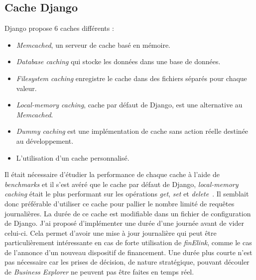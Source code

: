 \subsection{Cache Django}
Django propose 6 caches différents :
\begin{itemize}
\item \textit{Memcached}, un serveur de cache basé en mémoire.
\item \textit{Database caching} qui stocke les données dans une base de données.
\item \textit{Filesystem caching} enregistre le cache dans des fichiers séparés pour chaque valeur.
\item \textit{Local-memory caching}, cache par défaut de Django, est une alternative au \textit{Memcached}.
\item \textit{Dummy caching} est une implémentation de cache sans action réelle destinée au développement.
\item L'utilisation d'un cache personnalisé.
\end{itemize}
Il était nécessaire d'étudier la performance de chaque cache à l'aide de \textit{benchmarks} et il s'est avéré que le cache par défaut de Django, \textit{local-memory caching} était le plus performant sur les opérations \textit{get}, \textit{set} et \textit{delete}~\cite{CacheBench}. Il semblait donc préférable d'utiliser ce cache pour pallier le nombre limité de requêtes journalières. La durée de ce cache est modifiable dans un fichier de configuration de Django. J'ai proposé d'implémenter une durée d'une journée avant de vider celui-ci. Cela permet d'avoir une mise à jour journalière qui peut être particulièrement intéressante en cas de forte utilisation de \textit{finElink}, comme le cas de l'annonce d'un nouveau dispositif de financement. Une durée plus courte n'est pas nécessaire car les prises de décision, de nature stratégique, pouvant découler de \textit{Business Explorer} ne peuvent pas être faites en temps réel.

